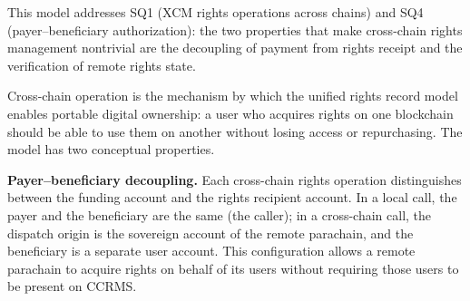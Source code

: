 This model addresses SQ1 (XCM rights operations across chains) and SQ4 (payer--beneficiary authorization): the two properties that make cross-chain rights management nontrivial are the decoupling of payment from rights receipt and the verification of remote rights state.

Cross-chain operation is the mechanism by which the unified rights record model enables portable digital ownership: a user who acquires rights on one blockchain should be able to use them on another without losing access or repurchasing. The model has two conceptual properties.

\textbf{Payer--beneficiary decoupling.} Each cross-chain rights operation distinguishes between the funding account and the rights recipient account. In a local call, the payer and the beneficiary are the same (the caller); in a cross-chain call, the dispatch origin is the sovereign account of the remote parachain, and the beneficiary is a separate user account. This configuration allows a remote parachain to acquire rights on behalf of its users without requiring those users to be present on CCRMS.


